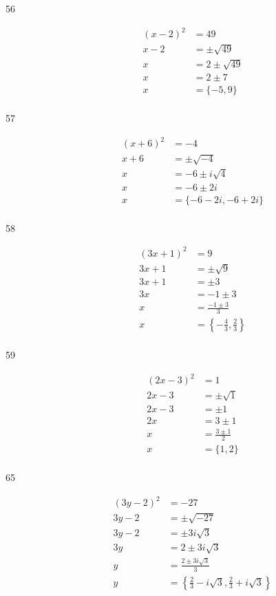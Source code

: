 \documentclass[fleqn,addpoints]{exam}
\begin{document}
\begin{description}
\item[56]
\begin{align*}
  (x-2)^2 &= 49 \\
  x-2 &= \pm \sqrt{49} \\
  x &= 2 \pm \sqrt{49} \\  
  x &= 2 \pm 7 \\  
  x &= \{ -5, 9 \} \\  
\end{align*}

\item[57]
\begin{align*}
  (x+6)^2 &= -4 \\
  x+6 &= \pm \sqrt{-4} \\
  x &= -6 \pm i \sqrt{4} \\  
  x &= -6 \pm 2i \\  
  x &= \{ -6 - 2i, -6 + 2i \} \\  
\end{align*}

\item[58]
\begin{align*}
  (3x+1)^2 &= 9 \\
  3x+1 &= \pm \sqrt{9} \\
  3x+1 &= \pm 3 \\
  3x &= -1 \pm 3 \\  
  x &= \frac{-1 \pm 3}{3} \\  
  x &= \left \{ - \frac{4}{3}, \frac{2}{3} \right \} \\  
\end{align*}

\item[59]
\begin{align*}
  (2x-3)^2 &= 1 \\
  2x-3 &= \pm \sqrt{1} \\
  2x-3 &= \pm 1 \\
  2x &= 3 \pm 1 \\  
  x &= \frac{3 \pm 1}{2} \\  
  x &= \{ 1, 2 \} \\  
\end{align*}

\item[65]
\begin{align*}
  (3y-2)^2 &= -27 \\
  3y-2 &= \pm \sqrt{-27} \\
  3y-2 &= \pm 3i \sqrt{3} \\
  3y &= 2 \pm 3i \sqrt{3} \\  
  y &= \frac{2 \pm 3i \sqrt{3}}{3} \\  
  y &= \left \{ \frac{2}{3} - i\sqrt{3}, \frac{2}{3} + i\sqrt{3} \right \} \\  
\end{align*}


\end{description}
\end{document}

